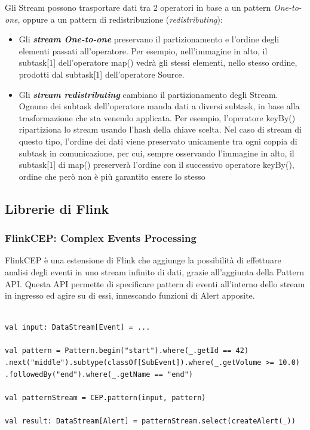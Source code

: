 Gli Stream possono trasportare dati tra 2 operatori in base a un pattern \textit{One-to-one}, oppure a un pattern di redistribuzione (\textit{redistributing}):
\begin{itemize}
	\item Gli \textbf{\textit{stream One-to-one}} preservano il partizionamento e l'ordine degli elementi passati all'operatore. Per esempio, nell'immagine in alto, il subtask[1] dell'operatore map() vedrà gli stessi elementi, nello stesso ordine, prodotti dal subtask[1] dell'operatore Source.
    \item Gli \textbf{\textit{stream redistributing}} cambiano il partizionamento degli Stream. Ognuno dei subtask dell'operatore manda dati a diversi subtask, in base alla trasformazione che sta venendo applicata. Per esempio, l'operatore keyBy() ripartiziona lo stream usando l'hash della chiave scelta. Nel caso di stream di questo tipo, l'ordine dei dati viene preservato unicamente tra ogni coppia di subtask in comunicazione, per cui, sempre osservando l'immagine in alto, il subtask[1] di map() preserverà l'ordine con il successivo operatore keyBy(), ordine che però non è più garantito essere lo stesso
\end{itemize}

\subsection{Librerie di Flink} \label{FlinkLibs}

\subsubsection{FlinkCEP: Complex Events Processing}

FlinkCEP è una estensione di Flink che aggiunge la possibilità di effettuare analisi degli eventi in uno stream infinito di dati, grazie all'aggiunta della Pattern API. Questa API permette di specificare pattern di eventi all'interno dello stream in ingresso ed agire su di essi, innescando funzioni di Alert apposite.
\\


\begin{code}
\label{code:pattern-example}
\begin{verbatim}

val input: DataStream[Event] = ...

val pattern = Pattern.begin("start").where(_.getId == 42)
.next("middle").subtype(classOf[SubEvent]).where(_.getVolume >= 10.0)
.followedBy("end").where(_.getName == "end")

val patternStream = CEP.pattern(input, pattern)

val result: DataStream[Alert] = patternStream.select(createAlert(_))
\end{verbatim}
\end{code}~\\


